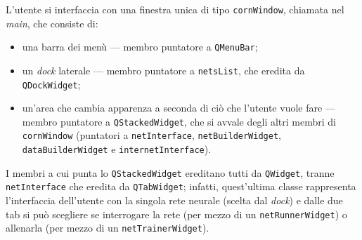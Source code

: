 \documentclass{article}
\begin{document}
L'utente si interfaccia con una finestra unica di tipo \texttt{cornWindow}, chiamata nel \emph{main}, che consiste di:
\begin{itemize}
 	\item una barra dei menù --- membro puntatore a \texttt{QMenuBar};
 	\item un \emph{dock} laterale --- membro puntatore a \texttt{netsList}, che eredita da \texttt{QDockWidget};
 	\item un'area che cambia apparenza a seconda di ciò che l'utente vuole fare --- membro puntatore a \texttt{QStackedWidget}, che si avvale degli altri membri di \texttt{cornWindow} (puntatori a \texttt{netInterface}, \texttt{netBuilderWidget}, \texttt{dataBuilderWidget} e \texttt{internetInterface}).
 \end{itemize}
I membri a cui punta lo \texttt{QStackedWidget} ereditano tutti da \texttt{QWidget}, tranne \texttt{netInterface} che eredita da \texttt{QTabWidget}; infatti, quest'ultima classe rappresenta l'interfaccia dell'utente con la singola rete neurale (scelta dal \emph{dock}) e dalle due tab si può scegliere se interrogare la rete (per mezzo di un \texttt{netRunnerWidget}) o allenarla (per mezzo di un \texttt{netTrainerWidget}).
\end{document}
